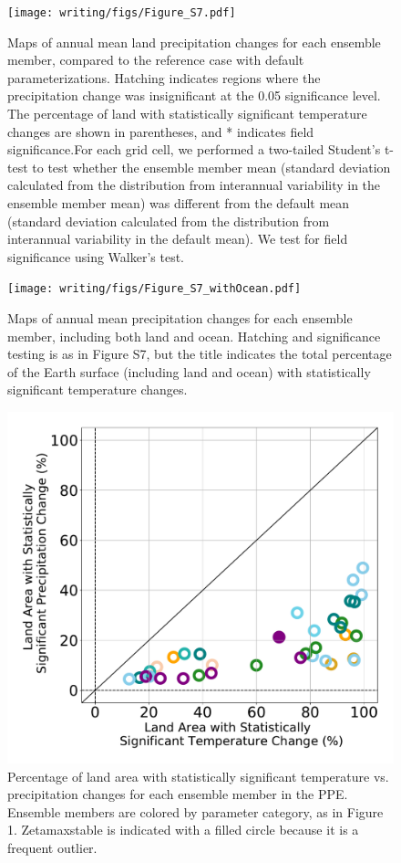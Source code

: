 \documentclass[draft,grl]{agutexSI2019}
\begin{document}
\begin{figure}[htb!]
\noindent\texttt{[image: writing/figs/Figure\_S7.pdf]}
\caption{Maps of annual mean land precipitation changes for each ensemble member, compared to the reference case with default parameterizations. Hatching indicates regions where the precipitation change was insignificant at the 0.05 significance level. The percentage of land with statistically significant temperature changes are shown in parentheses, and * indicates field significance.For each grid cell, we performed a two-tailed Student’s t-test to test whether the ensemble member mean (standard deviation calculated from the distribution from interannual variability in the ensemble member mean) was different from the default mean (standard deviation calculated from the distribution from interannual variability in the default mean). We test for field significance using Walker’s test.}
\label{fig:supp_maps_precip}
\end{figure}

\begin{figure}[htb!]
\noindent\texttt{[image: writing/figs/Figure\_S7\_withOcean.pdf]}
\caption{Maps of annual mean precipitation changes for each ensemble member, including both land and ocean. Hatching and significance testing is as in Figure S7, but the title indicates the total percentage of the Earth surface (including land and ocean) with statistically significant temperature changes.}
\label{fig:supp_maps_precip_landAndOcean}
\end{figure}

\begin{figure}[htb!]
\noindent\includegraphics[width=\textwidth]{writing/figs/Figure_S8.pdf}
\caption{Percentage of land area with statistically significant temperature vs. precipitation changes for each ensemble member in the PPE. Ensemble members are colored by parameter category, as in Figure 1. Zetamaxstable is indicated with a filled circle because it is a frequent outlier.}
\label{fig:supp_pct_stat_sig_land}
\end{figure}
\end{document}

